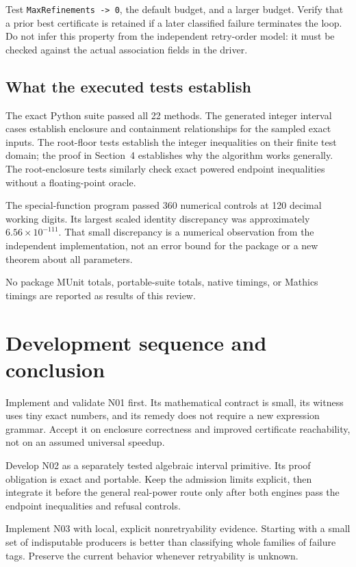 \documentclass[11pt,a4paper]{article}
\newcommand{\code}[1]{\nolinkurl{#1}}
\begin{document}
Test \code{MaxRefinements -> 0}, the default budget, and a larger budget. Verify that a prior best certificate is retained if a later classified failure terminates the loop. Do not infer this property from the independent retry-order model: it must be checked against the actual association fields in the driver.

\subsection{What the executed tests establish}

The exact Python suite passed all 22 methods. The generated integer interval cases establish enclosure and containment relationships for the sampled exact inputs. The root-floor tests establish the integer inequalities on their finite test domain; the proof in Section~4 establishes why the algorithm works generally. The root-enclosure tests similarly check exact powered endpoint inequalities without a floating-point oracle.

The special-function program passed 360 numerical controls at 120 decimal working digits. Its largest scaled identity discrepancy was approximately $6.56\times10^{-111}$. That small discrepancy is a numerical observation from the independent implementation, not an error bound for the package or a new theorem about all parameters.

No package MUnit totals, portable-suite totals, native timings, or Mathics timings are reported as results of this review.

\section{Development sequence and conclusion}

Implement and validate N01 first. Its mathematical contract is small, its witness uses tiny exact numbers, and its remedy does not require a new expression grammar. Accept it on enclosure correctness and improved certificate reachability, not on an assumed universal speedup.

Develop N02 as a separately tested algebraic interval primitive. Its proof obligation is exact and portable. Keep the admission limits explicit, then integrate it before the general real-power route only after both engines pass the endpoint inequalities and refusal controls.

Implement N03 with local, explicit nonretryability evidence. Starting with a small set of indisputable producers is better than classifying whole families of failure tags. Preserve the current behavior whenever retryability is unknown.
\end{document}
